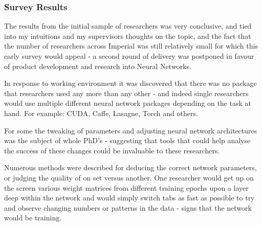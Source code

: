 \documentclass[a4paper,11pt,titlepage]{article}
\begin{document}
	\subsubsection{Survey Results}
	\par 
	The results from the initial sample of researchers was very conclusive, and tied into my intuitions and my supervisors thoughts on the topic, and the fact that the number of researchers across Imperial was still relatively small for which this early survey would appeal - a second round of delivery was postponed in favour of product development and research into Neural Networks.
	\par

	\begin{figure}[H]
	\end{figure}
	
	In response to working environment it was discovered that there was no package that researchers used any more than any other - and indeed single researchers would use multiple different neural network packages depending on the task at hand. For example: CUDA, Caffe, Lasagne, Torch and others. 
	\par 
	
	\begin{figure}[H]
	\end{figure}
	
	For some the tweaking of parameters and adjusting neural network architectures was the subject of whole PhD's - suggesting that tools that could help analyse the success of these changes could be invaluable to these researchers. 
	\par 
	Numerous methods were described for deducing the correct network parameters, or judging the quality of on set versus another. One researcher would get up on the screen various weight matrices from different training epochs upon a layer deep within the network and would simply switch tabs as fast as possible to try and observe changing numbers or patterns in the data - signs that the network would be training. 
	\par 
	
\end{document}
